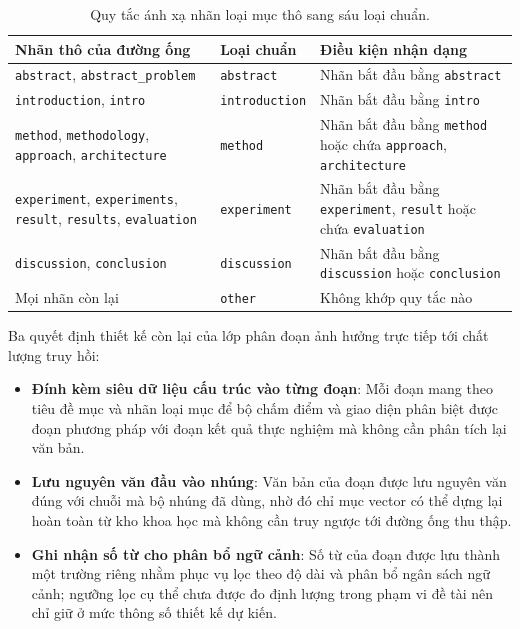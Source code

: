 \begin{table}[htbp]
    \centering
    \caption{Quy tắc ánh xạ nhãn loại mục thô sang sáu loại chuẩn.}
    \label{tab:anh-xa-nhan-muc}
    \small
    \begin{tabularx}{\textwidth}{@{}>{\raggedright\arraybackslash}p{5.0cm}>{\raggedright\arraybackslash}p{2.7cm}>{\raggedright\arraybackslash}X@{}}
        \toprule
        \textbf{Nhãn thô của đường ống} & \textbf{Loại chuẩn} & \textbf{Điều kiện nhận dạng} \\
        \midrule
        \texttt{abstract}, \texttt{abstract\_problem} & \texttt{abstract} & Nhãn bắt đầu bằng \texttt{abstract} \\
        \texttt{introduction}, \texttt{intro} & \texttt{introduction} & Nhãn bắt đầu bằng \texttt{intro} \\
        \texttt{method}, \texttt{methodology}, \texttt{approach}, \texttt{architecture} & \texttt{method} & Nhãn bắt đầu bằng \texttt{method} hoặc chứa \texttt{approach}, \texttt{architecture} \\
        \texttt{experiment}, \texttt{experiments}, \texttt{result}, \texttt{results}, \texttt{evaluation} & \texttt{experiment} & Nhãn bắt đầu bằng \texttt{experiment}, \texttt{result} hoặc chứa \texttt{evaluation} \\
        \texttt{discussion}, \texttt{conclusion} & \texttt{discussion} & Nhãn bắt đầu bằng \texttt{discussion} hoặc \texttt{conclusion} \\
        Mọi nhãn còn lại & \texttt{other} & Không khớp quy tắc nào \\
        \bottomrule
    \end{tabularx}
\end{table}

Ba quyết định thiết kế còn lại của lớp phân đoạn ảnh hưởng trực tiếp tới chất lượng truy hồi:
\begin{itemize}
    \item[--] \textbf{Đính kèm siêu dữ liệu cấu trúc vào từng đoạn}: Mỗi đoạn mang theo tiêu đề mục và nhãn loại mục để bộ chấm điểm và giao diện phân biệt được đoạn phương pháp với đoạn kết quả thực nghiệm mà không cần phân tích lại văn bản.
    \item[--] \textbf{Lưu nguyên văn đầu vào nhúng}: Văn bản của đoạn được lưu nguyên văn đúng với chuỗi mà bộ nhúng đã dùng, nhờ đó chỉ mục vector có thể dựng lại hoàn toàn từ kho khoa học mà không cần truy ngược tới đường ống thu thập.
    \item[--] \textbf{Ghi nhận số từ cho phân bổ ngữ cảnh}: Số từ của đoạn được lưu thành một trường riêng nhằm phục vụ lọc theo độ dài và phân bổ ngân sách ngữ cảnh; ngưỡng lọc cụ thể chưa được đo định lượng trong phạm vi đề tài nên chỉ giữ ở mức thông số thiết kế dự kiến.
\end{itemize}

